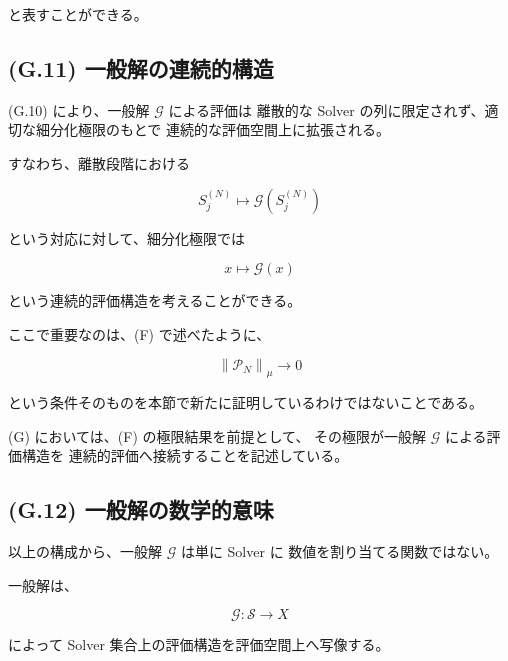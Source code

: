 \documentclass[a4paper,11pt]{article}
\begin{document}
と表すことができる。


\subsection{(G.11) 一般解の連続的構造}
\label{subsec:G11}

(G.10) により、一般解 $\mathcal{G}$ による評価は
離散的な Solver の列に限定されず、適切な細分化極限のもとで
連続的な評価空間上に拡張される。

すなわち、離散段階における

\begin{equation}
    S_j^{(N)}
    \longmapsto
    \mathcal{G}\!\left(S_j^{(N)}\right)
\end{equation}

という対応に対して、細分化極限では

\begin{equation}
    x
    \longmapsto
    \mathcal{G}(x)
\end{equation}

という連続的評価構造を考えることができる。

ここで重要なのは、(F) で述べたように、

\begin{equation}
    \left\|
    \mathcal{P}_N
    \right\|_\mu
    \longrightarrow0
\end{equation}

という条件そのものを本節で新たに証明しているわけではないことである。

(G) においては、(F) の極限結果を前提として、
その極限が一般解 $\mathcal{G}$ による評価構造を
連続的評価へ接続することを記述している。


\subsection{(G.12) 一般解の数学的意味}
\label{subsec:G12}

以上の構成から、一般解 $\mathcal{G}$ は単に Solver に
数値を割り当てる関数ではない。

一般解は、

\begin{equation}
    \boxed{
        \mathcal{G}:
        \mathcal{S}\longrightarrow X
    }
\end{equation}

によって Solver 集合上の評価構造を評価空間上へ写像する。
\end{document}
